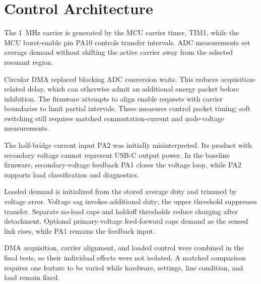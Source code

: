 \section{Control Architecture}
\label{sec:disc-control}

The \SI{1}{\mega\hertz} carrier is generated by the MCU carrier timer,
TIM1, while the MCU burst-enable pin PA10 controls transfer intervals.
ADC measurements set average demand without shifting the active carrier
away from the selected resonant region.

Circular DMA replaced blocking ADC conversion waits. This reduces
acquisition-related delay, which can otherwise admit an additional energy
packet before inhibition. The firmware attempts to align enable requests with carrier
boundaries to limit partial intervals. These measures control packet
timing; soft switching still requires matched commutation-current and
node-voltage measurements.

The half-bridge current input PA2 was initially misinterpreted. Its product
with secondary voltage cannot represent USB-C output power. In the baseline
firmware, secondary-voltage feedback PA1 closes the voltage loop, while
PA2 supports load classification and diagnostics.

Loaded demand is initialized from the stored average duty and trimmed by
voltage error. Voltage sag invokes additional duty; the upper threshold
suppresses transfer. Separate no-load caps and holdoff thresholds reduce
charging after detachment. Optional primary-voltage feed-forward caps
demand as the sensed link rises, while PA1 remains the feedback input.

DMA acquisition, carrier alignment, and loaded control were combined in
the final tests, so their individual effects were not isolated. A matched
comparison requires one feature to be varied while hardware, settings,
line condition, and load remain fixed.
